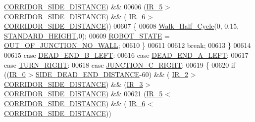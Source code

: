\begin{DoxyCode}
      \hyperlink{state__machine_8c_a201d56046ddf552d57b4862e0ec07a10}{CORRIDOR\_SIDE\_DISTANCE}) && 
00606                 (\hyperlink{state__machine_8c_ad00ba6cc1cf461bda7059f5aafc06142}{IR\_5} > \hyperlink{state__machine_8c_a201d56046ddf552d57b4862e0ec07a10}{CORRIDOR\_SIDE\_DISTANCE}) && (
      \hyperlink{state__machine_8c_a8c51bcd8b555e8c78fea79b88d28b55e}{IR\_6} > \hyperlink{state__machine_8c_a201d56046ddf552d57b4862e0ec07a10}{CORRIDOR\_SIDE\_DISTANCE}))
00607             \{
00608                 \hyperlink{gangstilar_8c_a8b22e9229a15d20adb676428ad7f6dac}{Walk\_Half\_Cycle}(0, 0.15, \hyperlink{state__machine_8c_ac66326c4fb942a9dfa998832832bc776}{STANDARD\_HEIGHT},0);
00609                 \hyperlink{state__machine_8h_a5e5321a4a9085b83c8161454bf7a145c}{ROBOT\_STATE} = \hyperlink{state__machine_8h_a94b1da2e055fff4d143aa6aa891f79a9a72c6eea91f84cfab54daac571b35fc53}{OUT\_OF\_JUNCTION\_NO\_WALL};
00610             \}
00611             
00612             \textcolor{keywordflow}{break};
00613         \}
00614         
00615         \textcolor{keywordflow}{case} \hyperlink{state__machine_8h_a94b1da2e055fff4d143aa6aa891f79a9ac5bacf79b8c32e3c1b8a8c37912ab6dc}{DEAD\_END\_B\_LEFT}:
00616         \textcolor{keywordflow}{case} \hyperlink{state__machine_8h_a94b1da2e055fff4d143aa6aa891f79a9a92ca0c1053b63e149cfdbf61c7163f5a}{DEAD\_END\_A\_LEFT}:
00617         \textcolor{keywordflow}{case} \hyperlink{state__machine_8h_a94b1da2e055fff4d143aa6aa891f79a9a5867af0449808578577a55aad42450ed}{TURN\_RIGHT}:
00618         \textcolor{keywordflow}{case} \hyperlink{state__machine_8h_a94b1da2e055fff4d143aa6aa891f79a9af47d2ce80e1460d0e5e877eac3115eb5}{JUNCTION\_C\_RIGHT}:
00619         \{
00620             \textcolor{keywordflow}{if} ((\hyperlink{state__machine_8c_a7afcf874a71b2cde367dc9c28f5f01f1}{IR\_0} > \hyperlink{state__machine_8c_a31ba7e3e0116f665d5825f669052ed09}{SIDE\_DEAD\_END\_DISTANCE}-60) && (
      \hyperlink{state__machine_8c_a07cfb2e201909d017a88a2a86c32cd4b}{IR\_2} > \hyperlink{state__machine_8c_a201d56046ddf552d57b4862e0ec07a10}{CORRIDOR\_SIDE\_DISTANCE}) && (\hyperlink{state__machine_8c_a7831b71dc250258ecefe0e23f9920688}{IR\_3} > 
      \hyperlink{state__machine_8c_a201d56046ddf552d57b4862e0ec07a10}{CORRIDOR\_SIDE\_DISTANCE}) && 
00621                 (\hyperlink{state__machine_8c_ad00ba6cc1cf461bda7059f5aafc06142}{IR\_5} < \hyperlink{state__machine_8c_a201d56046ddf552d57b4862e0ec07a10}{CORRIDOR\_SIDE\_DISTANCE}) && (
      \hyperlink{state__machine_8c_a8c51bcd8b555e8c78fea79b88d28b55e}{IR\_6} < \hyperlink{state__machine_8c_a201d56046ddf552d57b4862e0ec07a10}{CORRIDOR\_SIDE\_DISTANCE}))

\end{DoxyCode}
